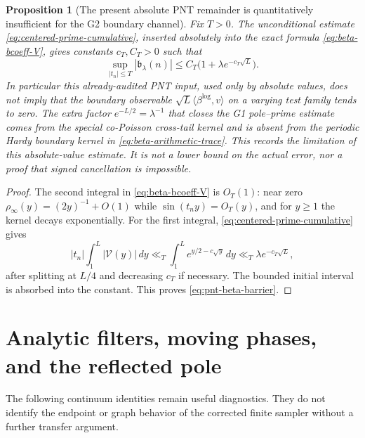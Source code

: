 \documentclass[11pt]{article}
\newtheorem{proposition}[theorem]{Proposition}
\theoremstyle{remark}
\begin{document}
\begin{proposition}[The present absolute PNT remainder is quantitatively insufficient for the G2 boundary channel]\label{prop:pnt-beta-barrier}
Fix $T>0$.  The unconditional estimate
\eqref{eq:centered-prime-cumulative}, inserted absolutely into the exact
formula \eqref{eq:beta-bcoeff-V}, gives constants $c_T,C_T>0$ such that
\begin{equation}\label{eq:pnt-beta-barrier}
 \boxed{
 \sup_{|t_n|\le T}|\mathfrak b_\lambda(n)|
 \le C_T\bigl(1+\lambda e^{-c_T\sqrt L}\bigr).}
\end{equation}
In particular this already-audited PNT input, used only by absolute values,
does not imply that the boundary observable
$\sqrt L\langle\beta^{\log},v\rangle$ on a varying test family tends to zero.  The
extra factor $e^{-L/2}=\lambda^{-1}$ that closes the G1 pole--prime estimate
comes from the special co-Poisson cross-tail kernel and is absent from the
periodic Hardy boundary kernel in \eqref{eq:beta-arithmetic-trace}.
This records the limitation of this absolute-value estimate. It is not a lower bound on the actual error, nor a proof that signed cancellation is impossible.
\end{proposition}
\begin{proof}
The second integral in \eqref{eq:beta-bcoeff-V} is $O_T(1)$: near zero
$\rho_\infty(y)=(2y)^{-1}+O(1)$ while
$\sin(t_ny)=O_T(y)$, and for $y\ge1$ the kernel decays exponentially.
For the first integral, \eqref{eq:centered-prime-cumulative} gives
\[
 |t_n|\int_1^L|\mathcal V(y)|\,dy
 \ll_T\int_1^Le^{y/2-c\sqrt y}\,dy
 \ll_T\lambda e^{-c_T\sqrt L},
\]
after splitting at $L/4$ and decreasing $c_T$ if necessary.  The bounded
initial interval is absorbed into the constant.  This proves
\eqref{eq:pnt-beta-barrier}.
\end{proof}
\section{Analytic filters, moving phases, and the reflected pole}\label{sec:filters}
The following continuum identities remain useful diagnostics. They do
not identify the endpoint or graph behavior of the corrected finite
sampler without a further transfer argument.
\end{document}
